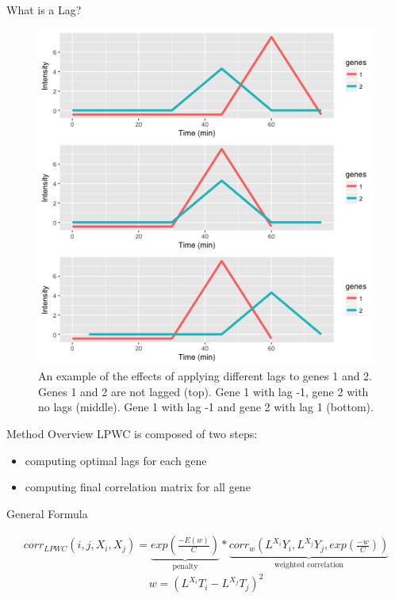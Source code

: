 \documentclass[10pt]{beamer}
\begin{document}
\begin{frame}{What is a Lag?}
\begin{figure}
     \includegraphics[width=0.60\linewidth]{Lags.png}
      \caption{An example of the effects of applying different lags to genes 1 and 2.  Genes 1 and 2 are not lagged (top). Gene 1 with lag -1, gene 2 with no lags (middle). Gene 1 with lag -1 and gene 2 with lag 1 (bottom).}
       \label{fig:lags}
    \end{figure}

\end{frame}


\begin{frame}{Method Overview}
LPWC is composed of two steps:
\begin{itemize}
\item computing optimal lags for each gene
\item computing final correlation matrix for all gene
\end{itemize}

General Formula

\begin{multline*}
corr_{LPWC}(i, j, X_i, X_j) = \underbrace{exp(\frac{- E(w)}{C})}_{\text{penalty}}  * 
\underbrace{corr_w(L^{X_i}Y_i, L^{X_j}Y_j, exp(\frac{- w}{C}))}_{\text{weighted correlation}}
\end{multline*}
$$w = (L^{X_i}T_i - L^{X_j}T_j)^2$$
\end{frame}
\end{document}
